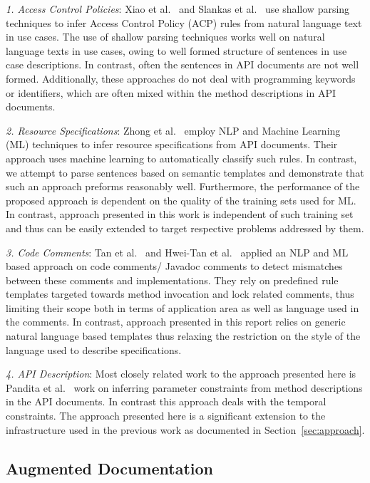 \textit{1. Access Control Policies}: Xiao et al.~\cite{XiaoFSE2012} and Slankas et al.~\cite{johnSlankasPASSAT13} use shallow parsing techniques to infer Access Control Policy (ACP) rules from natural language text in use cases.
The use of shallow parsing techniques works well on natural language texts in use cases, owing to well formed structure of sentences in use case descriptions.
In contrast, often the sentences in API documents are not well formed.
Additionally, these approaches do not deal with programming keywords or identifiers, which are often mixed within the method descriptions in API documents.

\textit{2. Resource Specifications}: Zhong et al.~\cite{zhong09SE} employ NLP and  Machine Learning (ML) techniques to infer resource specifications from API documents.
Their approach uses machine learning to automatically classify such rules.
In contrast, we attempt to parse sentences based on semantic templates and demonstrate that such an approach preforms reasonably well.
Furthermore, the performance of the proposed approach is dependent on the quality of the training sets used for ML.
In contrast, approach presented in this work is independent of such training set and thus can be easily extended to target respective problems addressed by them.
	
\textit{3. Code Comments}: Tan et al.~\cite{TanSOSP07} and Hwei-Tan et al.~\cite{tcomment} applied an NLP and ML  based approach on code comments/ Javadoc comments to detect mismatches between these comments and implementations. They rely on predefined rule templates targeted towards method invocation and lock related comments, thus limiting their scope both in terms of application area as well as language used in the comments. In contrast, approach presented in this report relies on generic natural language based templates thus relaxing the restriction on the style of the language used to describe specifications.
	
\textit{4. API Description}: Most closely related work to the approach presented here is Pandita et al.~\cite{pandita12:inferring} work on inferring parameter constraints from method descriptions in the API documents. In contrast this approach deals with the temporal constraints. The approach presented here is a significant extension to the infrastructure used in the previous work as documented in Section~\ref{sec:approach}.


\subsection{Augmented Documentation}

